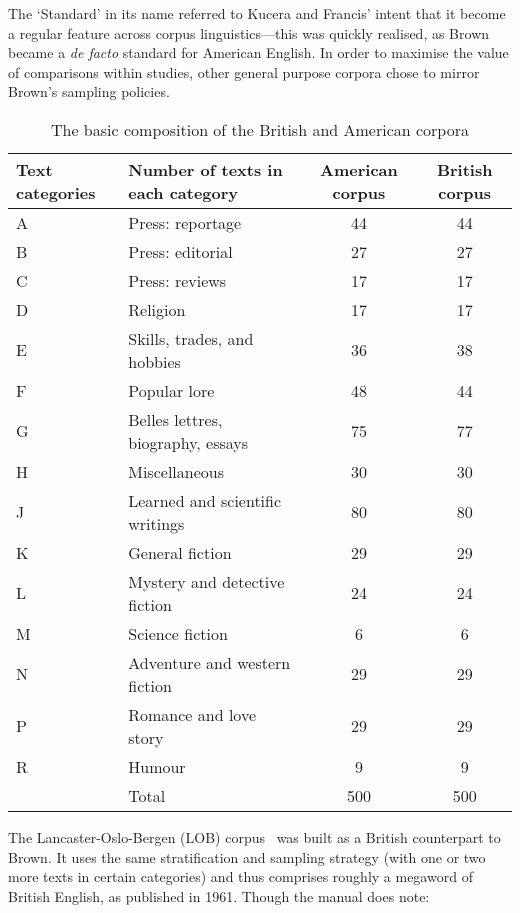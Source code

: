 The `Standard' in its name referred to Kucera and Francis' intent that it become a regular feature across corpus linguistics---this was quickly realised, as Brown became a \textsl{de facto} standard for American English.  In order to maximise the value of comparisons within studies, other general purpose corpora chose to mirror Brown's sampling policies.


\begin{table}[Ht]
    \centering


    \begin{tabular}{llcc}
    \hline
    Text categories & Number of texts in each category & American corpus & British corpus \\ \hline
    A & Press: reportage & 44 & 44 \\
    B & Press: editorial & 27 & 27 \\
    C & Press: reviews & 17 & 17 \\
    D & Religion & 17 & 17 \\
    E & Skills, trades, and hobbies & 36 & 38 \\
    F & Popular lore & 48 & 44 \\
    G & Belles lettres, biography, essays & 75 & 77 \\
    H & Miscellaneous & 30 & 30 \\
    J & Learned and scientific writings & 80 & 80 \\
    K & General fiction & 29 & 29 \\
    L & Mystery and detective fiction & 24 & 24 \\
    M & Science fiction & 6 & 6 \\
    N & Adventure and western fiction & 29 & 29 \\
    P & Romance and love story & 29 & 29 \\
    R & Humour & 9 & 9 \\ \hline
      & Total & 500 & 500 \\ \hline
    \end{tabular}

    \caption{The basic composition of the British and American corpora}
    \label{table:litreview:corpora:lobdist}
\end{table}


The Lancaster-Oslo-Bergen (LOB) corpus~\cite{johansson1986tagged} was built as a British counterpart to Brown.  
It uses the same stratification and sampling strategy (with one or two more texts in certain categories) and thus comprises roughly a megaword of British English, as published in 1961.  %
Though the manual does note:

